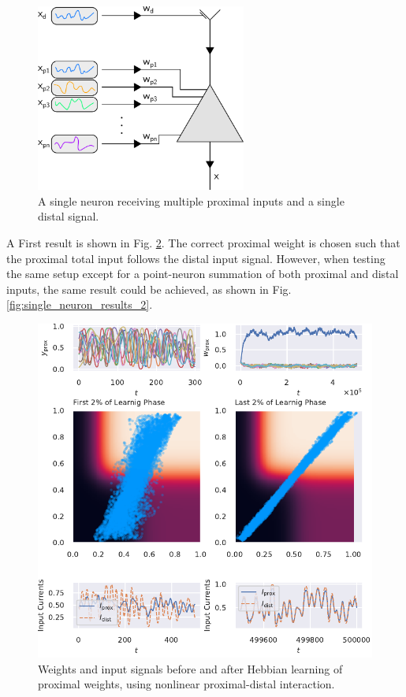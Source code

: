 \documentclass[10pt,a4paper,draft]{article}
\begin{document}
\begin{figure}
\centering
\includegraphics[width=6.91cm]{./figures/single_neuron_illustration.png}
\caption{A single neuron receiving multiple proximal inputs and a single distal signal.}
\label{fig:single_neuron_illustration}
\end{figure}

A First result is shown in Fig. \ref{fig:single_neuron_results_1}. The correct proximal weight is chosen such that the proximal total input follows the distal input signal. However, when testing the same setup except for a point-neuron summation of both proximal and distal inputs, the same result could be achieved, as shown in Fig. \ref{fig:single_neuron_results_2}. 

\begin{figure}
\centering
\includegraphics[width=\textwidth]{./figures/fig1.pdf}
\caption{Weights and input signals before and after Hebbian learning of proximal weights, using nonlinear proximal-distal interaction.}
\label{fig:single_neuron_results_1}
\end{figure}
\end{document}
